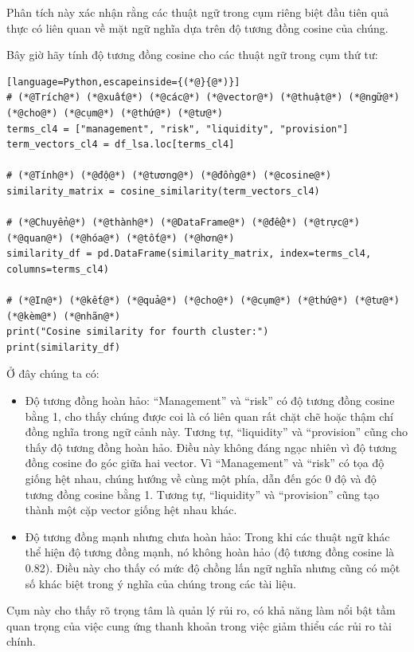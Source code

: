 Phân tích này xác nhận rằng các thuật ngữ trong cụm riêng biệt đầu tiên quả thực có liên quan về mặt ngữ nghĩa dựa trên độ tương đồng cosine của chúng.

Bây giờ hãy tính độ tương đồng cosine cho các thuật ngữ trong cụm thứ tư:

\begin{lstlisting}[language=Python,escapeinside={(*@}{@*)}]
# (*@Trích@*) (*@xuất@*) (*@các@*) (*@vector@*) (*@thuật@*) (*@ngữ@*) (*@cho@*) (*@cụm@*) (*@thứ@*) (*@tư@*)
terms_cl4 = ["management", "risk", "liquidity", "provision"]
term_vectors_cl4 = df_lsa.loc[terms_cl4]

# (*@Tính@*) (*@độ@*) (*@tương@*) (*@đồng@*) (*@cosine@*)
similarity_matrix = cosine_similarity(term_vectors_cl4)

# (*@Chuyển@*) (*@thành@*) (*@DataFrame@*) (*@để@*) (*@trực@*) (*@quan@*) (*@hóa@*) (*@tốt@*) (*@hơn@*)
similarity_df = pd.DataFrame(similarity_matrix, index=terms_cl4, columns=terms_cl4)

# (*@In@*) (*@kết@*) (*@quả@*) (*@cho@*) (*@cụm@*) (*@thứ@*) (*@tư@*) (*@kèm@*) (*@nhãn@*)
print("Cosine similarity for fourth cluster:")
print(similarity_df)
\end{lstlisting}

Ở đây chúng ta có:

\begin{itemize}
  \item Độ tương đồng hoàn hảo: ``Management'' và ``risk'' có độ tương đồng cosine bằng 1, cho thấy chúng được coi là có liên quan rất chặt chẽ hoặc thậm chí đồng nghĩa trong ngữ cảnh này. Tương tự, ``liquidity'' và ``provision'' cũng cho thấy độ tương đồng hoàn hảo. Điều này không đáng ngạc nhiên vì độ tương đồng cosine đo góc giữa hai vector. Vì ``Management'' và ``risk'' có tọa độ giống hệt nhau, chúng hướng về cùng một phía, dẫn đến góc 0 độ và độ tương đồng cosine bằng 1. Tương tự, ``liquidity'' và ``provision'' cũng tạo thành một cặp vector giống hệt nhau khác.

  \item Độ tương đồng mạnh nhưng chưa hoàn hảo: Trong khi các thuật ngữ khác thể hiện độ tương đồng mạnh, nó không hoàn hảo (độ tương đồng cosine là 0.82). Điều này cho thấy có mức độ chồng lấn ngữ nghĩa nhưng cũng có một số khác biệt trong ý nghĩa của chúng trong các tài liệu.
\end{itemize}

Cụm này cho thấy rõ trọng tâm là quản lý rủi ro, có khả năng làm nổi bật tầm quan trọng của việc cung ứng thanh khoản trong việc giảm thiểu các rủi ro tài chính.

